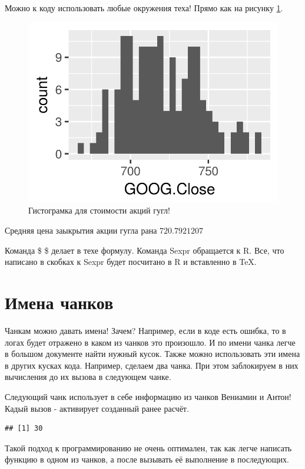 \documentclass[a4paper]{article}\usepackage[]{graphicx}\usepackage[]{color}
\makeatletter
\def\maxwidth{ %
  \ifdim\Gin@nat@width>\linewidth
    \linewidth
  \else
    \Gin@nat@width
  \fi
}
\newenvironment{kframe}{%
 \def\at@end@of@kframe{}%
 \ifinner\ifhmode%
  \def\at@end@of@kframe{\end{minipage}}%
  \begin{minipage}{\columnwidth}%
 \fi\fi%
 \def\FrameCommand##1{\hskip\@totalleftmargin \hskip-\fboxsep
 \colorbox{shadecolor}{##1}\hskip-\fboxsep
     \hskip-\linewidth \hskip-\@totalleftmargin \hskip\columnwidth}%
 \MakeFramed {\advance\hsize-\width
   \@totalleftmargin\z@ \linewidth\hsize
   \@setminipage}}%
 {\par\unskip\endMakeFramed%
 \at@end@of@kframe}
\newenvironment{knitrout}{}{} %
\makeatother
\begin{document}
Можно к коду использовать любые окружения теха! Прямо как на рисунку \ref{fig}.

\begin{figure}[h!]
\begin{knitrout}
\color{fgcolor}

{\centering \includegraphics[width=\maxwidth]{figure/unnamed-chunk-4-1} 

}



\end{knitrout}
\caption{Гистограмка для стоимости акций гугл! \label{fig}}
\end{figure}


Средняя цена заыкрытия акции гугла рана $720.7921207$

Команда \$ \$ делает в техе формулу. Команда Sexpr обращается к R. Все, что написано в скобках к Sexpr будет посчитано в R и вставленно в \TeX. 


\section{Имена чанков}

Чанкам можно давать имена! Зачем? Например, если в коде есть ошибка, то в логах будет отражено в каком из чанков это произошло. И по имени чанка легче в большом документе найти нужный кусок. Также можно использовать эти имена в других кусках кода. Например, сделаем два чанка. При этом заблокируем в них вычисления до их вызова в следующем чанке.





Следующий чанк использует в себе информацию из чанков Вениамин и Антон! Кадый вызов - активирует созданный ранее расчёт.

\begin{knitrout}
\color{fgcolor}\begin{kframe}
\begin{verbatim}
## [1] 30
\end{verbatim}
\end{kframe}
\end{knitrout}

Такой подход к программированию не очень оптимален, так как легче написать функцию в одном из чанков, а после вызывать её выполнение в последующих. 
\end{document}
